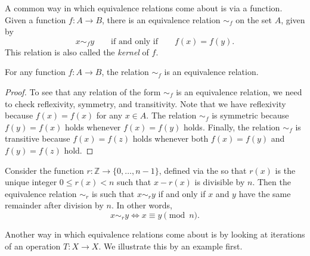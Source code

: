 A common way in which equivalence relations come about is via a function. Given a function $f:A\to B$, there is an equivalence relation $\sim_f$ on the set $A$, given by
\begin{equation*}
  x\sim_f y \qquad\text{if and only if}\qquad f(x)=f(y).
\end{equation*}
This relation is also called the \emph{kernel} of $f$.

\begin{proposition}
  For any function $f:A\to B$, the relation $\sim_f$ is an equivalence relation.
\end{proposition}

\begin{proof}
  To see that any relation of the form $\sim_f$ is an equivalence relation, we need to check reflexivity, symmetry, and transitivity. Note that we have reflexivity because $f(x)=f(x)$ for any $x\in A$. The relation $\sim_f$ is symmetric because $f(y)=f(x)$ holds whenever $f(x)=f(y)$ holds. Finally, the relation $\sim_f$ is transitive because $f(x)=f(z)$ holds whenever both $f(x)=f(y)$ and $f(y)=f(z)$ hold.
\end{proof}

\begin{example}
  Consider the function $r:\mathbb{Z}\to\{0,\ldots,n-1\}$, defined via the  so that $r(x)$ is the unique integer $0\leq r(x)<n$ such that $x-r(x)$ is divisible by $n$. Then the equivalence relation $\sim_{r}$ is such that $x\sim_r y$ if and only if $x$ and $y$ have the same remainder after division by $n$. In other words,
  \begin{equation*}
    x\sim_r y \Leftrightarrow x\equiv y\pmod{n}.
  \end{equation*}
\end{example}

Another way in which equivalence relations come about is by looking at iterations of an operation $T:X\to X$. We illustrate this by an example first.

